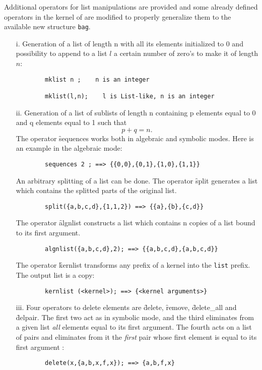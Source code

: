 Additional operators for list manipulations are provided and some already
defined operators in the kernel of \REDUCE are modified to properly
generalize them to the available new structure \texttt{bag}.
\begin{itemize}
\item[i.]
\hypertarget{operator:MKLIST}{}%
Generation of a list of length n with all its elements initialized to 0
and possibility to append to a list $l$ a certain number of
zero's to make it of length $n$:
\begin{verbatim}
        mklist n ;    n is an integer

        mklist(l,n);    l is List-like, n is an integer
\end{verbatim}

\item[ii.]
\hypertarget{operator:SEQUENCES}{}%
Generation of a list of sublists of length n containing p elements
equal to 0 and q elements equal to 1 such that  \[p+q=n .\]
The operator \f{sequences} works both in algebraic and
symbolic modes.  Here is an example in the algebraic mode:
\begin{verbatim}
        sequences 2 ; ==> {{0,0},{0,1},{1,0},{1,1}}
\end{verbatim}
\hypertarget{operator:SPLIT}{}%
An arbitrary splitting of a list can be done. The operator \f{split} 
generates a list which contains the splitted parts of the original list.
\begin{verbatim}
        split({a,b,c,d},{1,1,2}) ==> {{a},{b},{c,d}}
\end{verbatim}
\hypertarget{operator:ALGNLIST}{}%
The operator \f{algnlist} constructs a list which contains n copies  
of a list bound to its first argument.
\begin{verbatim}
        algnlist({a,b,c,d},2); ==> {{a,b,c,d},{a,b,c,d}}
\end{verbatim}
\hypertarget{operator:KERNLIST}{}%
The operator \f{kernlist} transforms any prefix of a kernel into the
\texttt{list} prefix. The output list is a copy:
\begin{verbatim}
        kernlist (<kernel>); ==> {<kernel arguments>}
\end{verbatim}
\item[iii.]
\hypertarget{operator:DELETE}{}
\hypertarget{operator:DELETE_ALL}{}
\hypertarget{operator:DELPAIR}{}
\hypertarget{operator:REMOVE}{}
Four operators to delete elements are \f{delete}, \f{remove}, \f{delete\_all} and
\f{delpair}. The first two act as in symbolic mode, and the third
eliminates from a given list \emph{all}
elements equal to its first argument. The fourth acts on a list of pairs
and eliminates from it the \emph{first} pair whose first element is equal to
its first argument :
\begin{verbatim}
        delete(x,{a,b,x,f,x}); ==> {a,b,f,x}


\end{verbatim}
\end{itemize}
